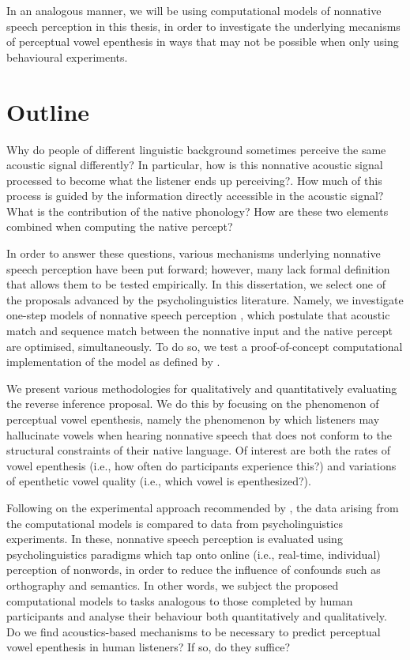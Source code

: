 In an analogous manner, we will be using computational models of nonnative speech perception in this thesis, in order to investigate the underlying mecanisms of perceptual vowel epenthesis in ways that may not be possible when only using behavioural experiments.  

\section{Outline}
Why do people of different linguistic background sometimes perceive the same acoustic signal differently? In particular, how is this nonnative acoustic signal processed to become what the listener ends up perceiving?. How much of this process is guided by the information directly accessible in the acoustic signal? What is the contribution of the native phonology? How are these two elements combined when computing the native percept?

In order to answer these questions, various mechanisms underlying nonnative speech perception have been put forward; however, many lack formal definition that allows them to be tested empirically.  
In this dissertation, we select one of the proposals advanced by the psycholinguistics literature. Namely, we investigate one-step models of nonnative speech perception \cite{dupoux2011, dejong2012, wilson2013, durvasula2015}, which postulate that acoustic match and sequence match between the nonnative input and the native percept are optimised, simultaneously. To do so, we test a proof-of-concept computational implementation of the model as defined by \cite{wilson2013}. 

We present various methodologies for qualitatively and quantitatively evaluating the reverse inference proposal. We do this by focusing on the phenomenon of perceptual vowel epenthesis, namely the phenomenon by which listeners may hallucinate vowels when hearing nonnative speech that does not conform to the structural constraints of their native language. Of interest are both the rates of vowel epenthesis (i.e., how often do participants experience this?) and variations of epenthetic vowel quality (i.e., which vowel is epenthesized?).

Following on the experimental approach recommended by \cite{vendelin2006}, the data arising from the computational models is compared to data from psycholinguistics experiments. In these, nonnative speech perception is evaluated using psycholinguistics paradigms which tap onto online (i.e., real-time, individual) perception of nonwords, in order to reduce the influence of confounds such as orthography and semantics.
In other words, we subject the proposed computational models to tasks analogous to those completed by human participants and analyse their behaviour both quantitatively and qualitatively. Do we find acoustics-based mechanisms to be necessary to predict perceptual vowel epenthesis in human listeners? If so, do they suffice?

